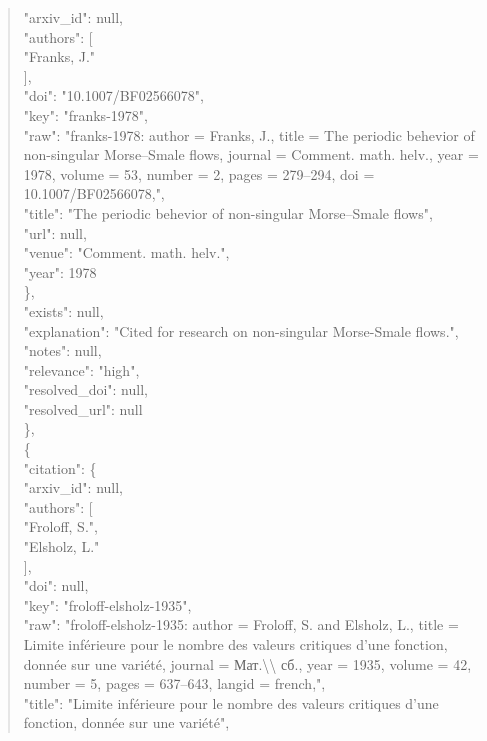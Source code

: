 \documentclass[11pt]{article}
\begin{document}
\begin{quote}
        "arxiv\_id": null,\\
        "authors": [\\
          "Franks, J."\\
        ],\\
        "doi": "10.1007/BF02566078",\\
        "key": "franks-1978",\\
        "raw": "franks-1978: author = Franks, J., title = The periodic behevior of non-singular Morse--Smale flows, journal = Comment. math. helv., year = 1978, volume = 53, number = 2, pages = 279--294, doi = 10.1007/BF02566078,",\\
        "title": "The periodic behevior of non-singular Morse--Smale flows",\\
        "url": null,\\
        "venue": "Comment. math. helv.",\\
        "year": 1978\\
      \},\\
      "exists": null,\\
      "explanation": "Cited for research on non-singular Morse-Smale flows.",\\
      "notes": null,\\
      "relevance": "high",\\
      "resolved\_doi": null,\\
      "resolved\_url": null\\
    \},\\
    \{\\
      "citation": \{\\
        "arxiv\_id": null,\\
        "authors": [\\
          "Froloff, S.",\\
          "Elsholz, L."\\
        ],\\
        "doi": null,\\
        "key": "froloff-elsholz-1935",\\
        "raw": "froloff-elsholz-1935: author = Froloff, S. and Elsholz, L., title = Limite inférieure pour le nombre des valeurs critiques d'une fonction, donnée sur une variété, journal = Мат.\textbackslash{}\textbackslash{} сб., year = 1935, volume = 42, number = 5, pages = 637--643, langid = french,",\\
        "title": "Limite inférieure pour le nombre des valeurs critiques d'une fonction, donnée sur une variété",\\

\end{quote}
\end{document}
